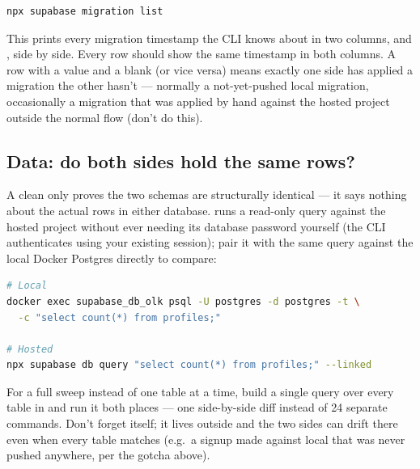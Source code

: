 \begin{lstlisting}[style=olkcodebash, language=bash, caption={Compares local migration files against the hosted project's applied history}]
npx supabase migration list
\end{lstlisting}

This prints every migration timestamp the CLI knows about in two columns,  and , side by side. Every row should show the same timestamp in both columns. A row with a  value and a blank  (or vice versa) means exactly one side has applied a migration the other hasn't — normally a not-yet-pushed local migration, occasionally a migration that was applied by hand against the hosted project outside the normal  flow (don't do this).

\subsection{Data: do both sides hold the same rows?}

A clean  only proves the two schemas are structurally identical — it says nothing about the actual rows in either database.  runs a read-only query against the hosted project without ever needing its database password yourself (the CLI authenticates using your existing  session); pair it with the same query against the local Docker Postgres directly to compare:

\begin{lstlisting}[style=olkcodebash, language=bash, caption={Row-count comparison — repeat per table, or script over all of them}]
# Local
docker exec supabase_db_olk psql -U postgres -d postgres -t \
  -c "select count(*) from profiles;"

# Hosted
npx supabase db query "select count(*) from profiles;" --linked
\end{lstlisting}

\begin{olktip}
For a full sweep instead of one table at a time, build a single  query over every table in  and run it both places — one side-by-side diff instead of 24 separate commands. Don't forget  itself; it lives outside  and the two sides can drift there even when every  table matches (e.g.\ a signup made against local that was never pushed anywhere, per the  gotcha above).
\end{olktip}

